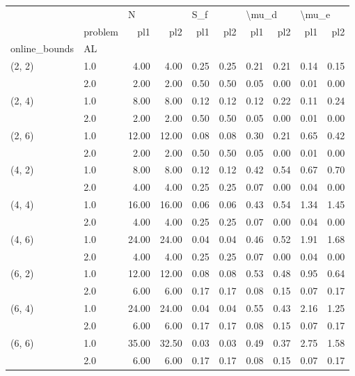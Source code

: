 \begin{tabular}{llrrrrrrrr}
\toprule
       & {} & \multicolumn{2}{l}{N} & \multicolumn{2}{l}{S\_f} & \multicolumn{2}{l}{\textbackslash mu\_d} & \multicolumn{2}{l}{\textbackslash mu\_e} \\
       & problem &   pl1 &   pl2 &  pl1 &  pl2 &   pl1 &  pl2 &   pl1 &  pl2 \\
online\_bounds & AL &       &       &      &      &       &      &       &      \\
\midrule
(2, 2) & 1.0 &  4.00 &  4.00 & 0.25 & 0.25 &  0.21 & 0.21 &  0.14 & 0.15 \\
       & 2.0 &  2.00 &  2.00 & 0.50 & 0.50 &  0.05 & 0.00 &  0.01 & 0.00 \\
(2, 4) & 1.0 &  8.00 &  8.00 & 0.12 & 0.12 &  0.12 & 0.22 &  0.11 & 0.24 \\
       & 2.0 &  2.00 &  2.00 & 0.50 & 0.50 &  0.05 & 0.00 &  0.01 & 0.00 \\
(2, 6) & 1.0 & 12.00 & 12.00 & 0.08 & 0.08 &  0.30 & 0.21 &  0.65 & 0.42 \\
       & 2.0 &  2.00 &  2.00 & 0.50 & 0.50 &  0.05 & 0.00 &  0.01 & 0.00 \\
(4, 2) & 1.0 &  8.00 &  8.00 & 0.12 & 0.12 &  0.42 & 0.54 &  0.67 & 0.70 \\
       & 2.0 &  4.00 &  4.00 & 0.25 & 0.25 &  0.07 & 0.00 &  0.04 & 0.00 \\
(4, 4) & 1.0 & 16.00 & 16.00 & 0.06 & 0.06 &  0.43 & 0.54 &  1.34 & 1.45 \\
       & 2.0 &  4.00 &  4.00 & 0.25 & 0.25 &  0.07 & 0.00 &  0.04 & 0.00 \\
(4, 6) & 1.0 & 24.00 & 24.00 & 0.04 & 0.04 &  0.46 & 0.52 &  1.91 & 1.68 \\
       & 2.0 &  4.00 &  4.00 & 0.25 & 0.25 &  0.07 & 0.00 &  0.04 & 0.00 \\
(6, 2) & 1.0 & 12.00 & 12.00 & 0.08 & 0.08 &  0.53 & 0.48 &  0.95 & 0.64 \\
       & 2.0 &  6.00 &  6.00 & 0.17 & 0.17 &  0.08 & 0.15 &  0.07 & 0.17 \\
(6, 4) & 1.0 & 24.00 & 24.00 & 0.04 & 0.04 &  0.55 & 0.43 &  2.16 & 1.25 \\
       & 2.0 &  6.00 &  6.00 & 0.17 & 0.17 &  0.08 & 0.15 &  0.07 & 0.17 \\
(6, 6) & 1.0 & 35.00 & 32.50 & 0.03 & 0.03 &  0.49 & 0.37 &  2.75 & 1.58 \\
       & 2.0 &  6.00 &  6.00 & 0.17 & 0.17 &  0.08 & 0.15 &  0.07 & 0.17 \\
\bottomrule
\end{tabular}
